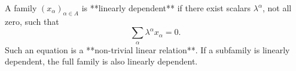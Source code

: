 A family $(x_\alpha)_{\alpha \in A}$ is **linearly dependent** if there exist scalars $\lambda^\alpha$, not all zero, such that
$$\sum_{\alpha} \lambda^\alpha x_\alpha = 0.$$
Such an equation is a **non-trivial linear relation**. If a subfamily is linearly dependent, the full family is also linearly dependent.
